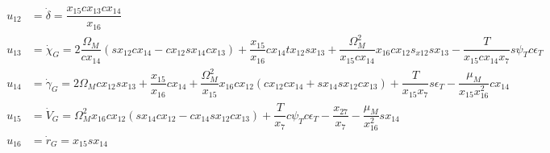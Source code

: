 \begin{align} \label{eq:unAuxEq2}
\begin{split} 
u_{12} &= \dot{\delta} = \dfrac{x_{15}cx_{13}cx_{14}}{x_{16}}\\
u_{13} &= \dot{\chi}_{G} = 2\dfrac{\Omega_{M}}{cx_{14}}\left(sx_{12}cx_{14}-cx_{12}sx_{14}cx_{13}\right)+\dfrac{x_{15}}{x_{16}}cx_{14}tx_{12}sx_{13}+\dfrac{\Omega_{M}^{2}}{x_{15}cx_{14}}x_{16}cx_{12}s_{x12}sx_{13}-\dfrac{T}{x_{15}cx_{14}x_{7}}s\psi_{T}c\epsilon_{T} \\
u_{14} &= \dot{\gamma}_{G} = 2\Omega_{M}cx_{12}sx_{13}+\dfrac{x_{15}}{x_{16}}cx_{14}+\dfrac{\Omega_{M}^{2}}{x_{15}}x_{16}cx_{12}\left(cx_{12}cx_{14}+sx_{14}sx_{12}cx_{13}\right)+\dfrac{T}{x_{15}x_{7}}s\epsilon_{T}-\dfrac{\mu_{M}}{x_{15}x_{16}^{2}}cx_{14} \\
u_{15} &= \dot{V}_{G} = \Omega_{M}^{2}x_{16}cx_{12}\left(sx_{14}cx_{12}-cx_{14}sx_{12}cx_{13}\right)+\dfrac{T}{x_{7}}c\psi_{T}c\epsilon_{T}-\dfrac{x_{27}}{x_{7}}-\dfrac{\mu_{M}}{x_{16}^{2}}sx_{14} \\
u_{16} &= \dot{r}_{G} = x_{15}sx_{14}\\
\end{split}
\end{align}


